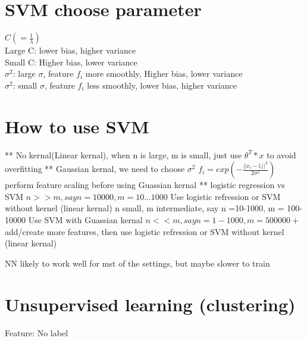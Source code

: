 \documentclass[10pt]{article}
\begin{document}



\section{SVM choose parameter}
  \noindent $C (=\frac{1}{\lambda}) $\\
  Large C: lower bias, higher variance\\
  Small C: Higher bias, lower variance\\
  $\sigma^2$: large $\sigma$, feature $f_i$ more smoothly, Higher bias, lower variance\\
  $\sigma^2$: small $\sigma$, feature $f_i$ less smoothly, lower bias, higher variance\\

\section{How to use SVM}

  ** No kernal(Linear kernal), when n is large, m is small, just use $\theta^T*x$ to avoid overfitting
  ** Gaussian kernal, we need to choose $\sigma^2$
  $f_i = exp(-\frac{||x_i-l_i||^2}{2\sigma^2})$
  perform feature scaling before using Guassian kernal
  ** logistic regression vs SVM
  $n >> m, say n = 10000, m = 10...1000$
  Use logistic refression or SVM without kernel (linear kernal)
  n small, m intermediate, say n =10-1000, m = 100-10000
  Use SVM with Guassian kernal
  $n << m, say n = 1-1000, m = 500000+$
  add/create more features, then use logistic refression or SVM without kernel (linear kernal)

  NN likely to work well for mst of the settings, but maybe slower to train


\section{Unsupervised learning (clustering)}
  Feature: No label\\
\end{document}
